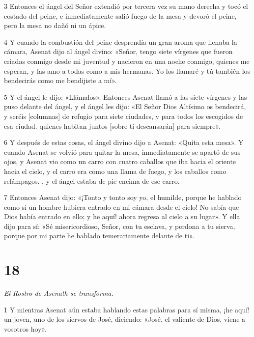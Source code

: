 \par 3 Entonces el ángel del Señor extendió por tercera vez su mano derecha y tocó el costado del peine, e inmediatamente salió fuego de la mesa y devoró el peine, pero la mesa no dañó ni un ápice.

\par 4 Y cuando la combustión del peine desprendía un gran aroma que llenaba la cámara, Asenat dijo al ángel divino: «Señor, tengo siete vírgenes que fueron criadas conmigo desde mi juventud y nacieron en una noche conmigo, quienes me esperan, y las amo a todas como a mis hermanas. Yo los llamaré y tú también los bendecirás como me bendijiste a mí».

\par 5 Y el ángel le dijo: «Llámalos». Entonces Asenat llamó a las siete vírgenes y las puso delante del ángel, y el ángel les dijo: «El Señor Dios Altísimo os bendecirá, y seréis [columnas] de refugio para siete ciudades, y para todos los escogidos de esa ciudad. quienes habitan juntos [sobre ti descansarán] para siempre».

\par 6 Y después de estas cosas, el ángel divino dijo a Asenat: «Quita esta mesa». Y cuando Asenat se volvió para quitar la mesa, inmediatamente se apartó de sus ojos, y Asenat vio como un carro con cuatro caballos que iba hacia el oriente hacia el cielo, y el carro era como una llama de fuego, y los caballos como relámpagos. , y el ángel estaba de pie encima de ese carro.

\par 7 Entonces Asenat dijo: «¡Tonto y tonto soy yo, el humilde, porque he hablado como si un hombre hubiera entrado en mi cámara desde el cielo! No sabía que Dios había entrado en ello; y he aquí! ahora regresa al cielo a su lugar». Y ella dijo para sí: «Sé misericordioso, Señor, con tu esclava, y perdona a tu sierva, porque por mi parte he hablado temerariamente delante de ti».

\chapter{18}

\par \textit{El Rostro de Asenath se transforma.}

\par 1 Y mientras Asenat aún estaba hablando estas palabras para sí misma, ¡he aquí! un joven, uno de los siervos de José, diciendo: «José, el valiente de Dios, viene a vosotros hoy».

